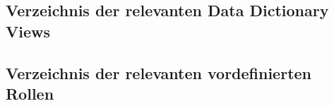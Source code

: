       \subsection{Verzeichnis der relevanten Data Dictionary Views}
        \begin{literaturinternet}
          \item \cite{sthref1100}
          \item \cite{sthref1102}
          \item \cite{sthref1608}
          \item \cite{sthref1610}
          \item \cite{sthref1894}
          \item \cite{sthref2538}
          \item \cite{sthref2385}
          \item \cite{sthref2382}
          \item \cite{sthref2523}
          \item \cite{sthref2579}
          \item \cite{sthref2723}
          \item \cite{sthref2725}
          \item \cite{sthref2727}
          \item \cite{sthref2736}
          \item \cite{sthref2738}
          \item \cite{sthref3518}
          \item \cite{sthref3655}
        \end{literaturinternet}
      \subsection{Verzeichnis der relevanten vordefinierten Rollen}
        \begin{literaturinternet}
          \item \cite{DBSEG99887}
        \end{literaturinternet}
\clearpage
